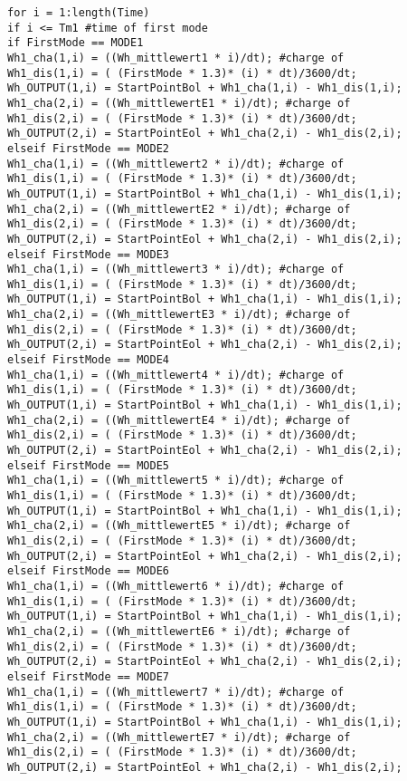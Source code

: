 \begin{appendix}
\begin{lstlisting}
for i = 1:length(Time)
if i <= Tm1 #time of first mode
if FirstMode == MODE1 
Wh1_cha(1,i) = ((Wh_mittlewert1 * i)/dt); #charge of 
Wh1_dis(1,i) = ( (FirstMode * 1.3)* (i) * dt)/3600/dt;
Wh_OUTPUT(1,i) = StartPointBol + Wh1_cha(1,i) - Wh1_dis(1,i);            
Wh1_cha(2,i) = ((Wh_mittlewertE1 * i)/dt); #charge of 
Wh1_dis(2,i) = ( (FirstMode * 1.3)* (i) * dt)/3600/dt;
Wh_OUTPUT(2,i) = StartPointEol + Wh1_cha(2,i) - Wh1_dis(2,i);
elseif FirstMode == MODE2
Wh1_cha(1,i) = ((Wh_mittlewert2 * i)/dt); #charge of 
Wh1_dis(1,i) = ( (FirstMode * 1.3)* (i) * dt)/3600/dt;
Wh_OUTPUT(1,i) = StartPointBol + Wh1_cha(1,i) - Wh1_dis(1,i);
Wh1_cha(2,i) = ((Wh_mittlewertE2 * i)/dt); #charge of 
Wh1_dis(2,i) = ( (FirstMode * 1.3)* (i) * dt)/3600/dt;
Wh_OUTPUT(2,i) = StartPointEol + Wh1_cha(2,i) - Wh1_dis(2,i);
elseif FirstMode == MODE3
Wh1_cha(1,i) = ((Wh_mittlewert3 * i)/dt); #charge of 
Wh1_dis(1,i) = ( (FirstMode * 1.3)* (i) * dt)/3600/dt;
Wh_OUTPUT(1,i) = StartPointBol + Wh1_cha(1,i) - Wh1_dis(1,i);
Wh1_cha(2,i) = ((Wh_mittlewertE3 * i)/dt); #charge of 
Wh1_dis(2,i) = ( (FirstMode * 1.3)* (i) * dt)/3600/dt;
Wh_OUTPUT(2,i) = StartPointEol + Wh1_cha(2,i) - Wh1_dis(2,i);
elseif FirstMode == MODE4
Wh1_cha(1,i) = ((Wh_mittlewert4 * i)/dt); #charge of 
Wh1_dis(1,i) = ( (FirstMode * 1.3)* (i) * dt)/3600/dt;
Wh_OUTPUT(1,i) = StartPointBol + Wh1_cha(1,i) - Wh1_dis(1,i);
Wh1_cha(2,i) = ((Wh_mittlewertE4 * i)/dt); #charge of 
Wh1_dis(2,i) = ( (FirstMode * 1.3)* (i) * dt)/3600/dt;
Wh_OUTPUT(2,i) = StartPointEol + Wh1_cha(2,i) - Wh1_dis(2,i);
elseif FirstMode == MODE5
Wh1_cha(1,i) = ((Wh_mittlewert5 * i)/dt); #charge of 
Wh1_dis(1,i) = ( (FirstMode * 1.3)* (i) * dt)/3600/dt;
Wh_OUTPUT(1,i) = StartPointBol + Wh1_cha(1,i) - Wh1_dis(1,i);
Wh1_cha(2,i) = ((Wh_mittlewertE5 * i)/dt); #charge of 
Wh1_dis(2,i) = ( (FirstMode * 1.3)* (i) * dt)/3600/dt;
Wh_OUTPUT(2,i) = StartPointEol + Wh1_cha(2,i) - Wh1_dis(2,i);
elseif FirstMode == MODE6
Wh1_cha(1,i) = ((Wh_mittlewert6 * i)/dt); #charge of 
Wh1_dis(1,i) = ( (FirstMode * 1.3)* (i) * dt)/3600/dt;
Wh_OUTPUT(1,i) = StartPointBol + Wh1_cha(1,i) - Wh1_dis(1,i);
Wh1_cha(2,i) = ((Wh_mittlewertE6 * i)/dt); #charge of 
Wh1_dis(2,i) = ( (FirstMode * 1.3)* (i) * dt)/3600/dt;
Wh_OUTPUT(2,i) = StartPointEol + Wh1_cha(2,i) - Wh1_dis(2,i);
elseif FirstMode == MODE7
Wh1_cha(1,i) = ((Wh_mittlewert7 * i)/dt); #charge of 
Wh1_dis(1,i) = ( (FirstMode * 1.3)* (i) * dt)/3600/dt;
Wh_OUTPUT(1,i) = StartPointBol + Wh1_cha(1,i) - Wh1_dis(1,i);
Wh1_cha(2,i) = ((Wh_mittlewertE7 * i)/dt); #charge of 
Wh1_dis(2,i) = ( (FirstMode * 1.3)* (i) * dt)/3600/dt;
Wh_OUTPUT(2,i) = StartPointEol + Wh1_cha(2,i) - Wh1_dis(2,i);

\end{lstlisting}
\end{appendix}
